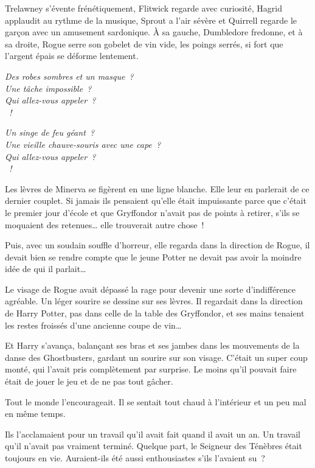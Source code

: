 Trelawney s'évente frénétiquement, Flitwick regarde avec curiosité, Hagrid applaudit au rythme de la musique, Sprout a l'air sévère et Quirrell regarde le garçon avec un amusement sardonique. À sa gauche, Dumbledore fredonne, et à sa droite, Rogue serre son gobelet de vin vide, les poings serrés, si fort que l'argent épais se déforme lentement.

\begin{center}
\emph{Des robes sombres et un masque~?\\
Une tâche impossible~?\\
Qui allez-vous appeler~?\\
~!}

\emph{Un singe de feu géant~?\\
Une vieille chauve-souris avec une cape~?\\
Qui allez-vous appeler~?\\
~!}
\end{center}

Les lèvres de Minerva se figèrent en une ligne blanche. Elle leur en parlerait de ce dernier couplet. Si jamais ils pensaient qu'elle était impuissante parce que c'était le premier jour d'école et que Gryffondor n'avait pas de points à retirer, s'ils se moquaient des retenues… elle trouverait autre chose~!

Puis, avec un soudain souffle d'horreur, elle regarda dans la direction de Rogue, il devait bien se rendre compte que le jeune Potter ne devait pas avoir la moindre idée de qui il parlait…

Le visage de Rogue avait dépassé la rage pour devenir une sorte d'indifférence agréable. Un léger sourire se dessine sur ses lèvres. Il regardait dans la direction de Harry Potter, pas dans celle de la table des Gryffondor, et ses mains tenaient les restes froissés d'une ancienne coupe de vin…

Et Harry s'avança, balançant ses bras et ses jambes dans les mouvements de la danse des Ghostbusters, gardant un sourire sur son visage. C'était un super coup monté, qui l'avait pris complètement par surprise. Le moins qu'il pouvait faire était de jouer le jeu et de ne pas tout gâcher.

Tout le monde l'encourageait. Il se sentait tout chaud à l'intérieur et un peu mal en même temps.

Ils l'acclamaient pour un travail qu'il avait fait quand il avait un an. Un travail qu'il n'avait pas vraiment terminé. Quelque part, le Seigneur des Ténèbres était toujours en vie. Auraient-ils été aussi enthousiastes s'ils l'avaient su~?


